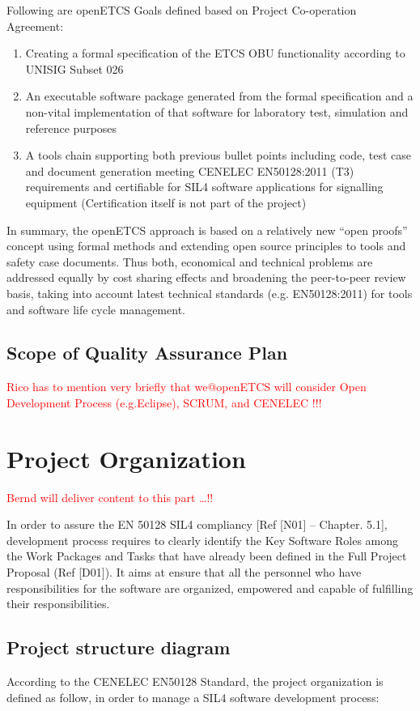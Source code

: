\documentclass{template/openetcs_article}
\begin{document}
Following are openETCS Goals defined based on Project Co-operation Agreement:
\begin{enumerate}
\item Creating a formal specification of the ETCS OBU functionality according to UNISIG Subset 026

\item An executable software package generated from the formal specification and a non-vital implementation of that software for laboratory test, simulation and reference purposes

\item A tools chain supporting both previous bullet points including code, test case and document generation meeting CENELEC EN50128:2011 (T3) requirements and certifiable for SIL4 software applications for signalling equipment (Certification itself is not part of the project)
\end{enumerate}
In summary, the openETCS approach is based on a relatively new ``open proofs'' concept using formal methods and extending open source principles to tools and safety case documents. Thus both, economical and technical problems are addressed equally by cost sharing effects and broadening the peer-to-peer review basis, taking into account latest technical standards (e.g. EN50128:2011) for tools and software life cycle management.


\subsection{Scope of Quality Assurance Plan}
\textcolor{red}{Rico has to mention very briefly that we@openETCS will consider Open Development Process (e.g.Eclipse), SCRUM,  and CENELEC !!!}


\section{Project Organization}
\textcolor{red}{Bernd will deliver content to this part \dots!! }

In order to assure the EN 50128 SIL4 compliancy [Ref [N01] -- Chapter. 5.1], development process requires to clearly identify the Key Software Roles among the Work Packages and Tasks that have already been defined in the Full Project Proposal (Ref [D01]). It aims at ensure that all the personnel who have responsibilities for the software are organized, empowered and capable of fulfilling their responsibilities.


\subsection{Project structure diagram}
According to the CENELEC EN50128 Standard, the project organization is defined as follow, in order to manage a SIL4 software development process:
\end{document}
